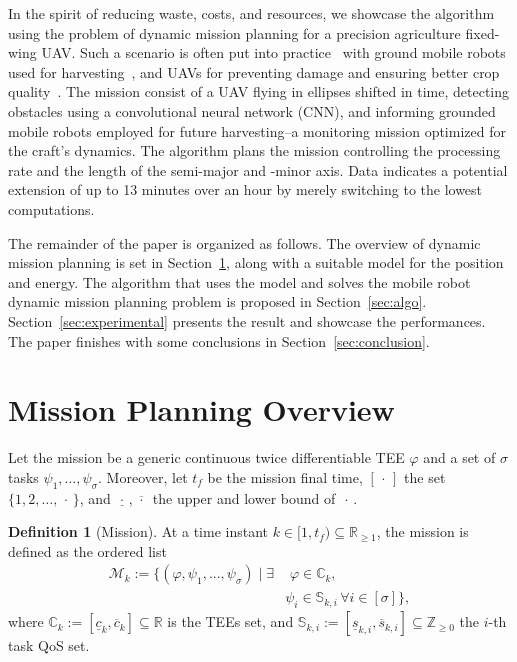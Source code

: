 \documentclass[letterpaper,10pt,conference]{ieeeconf}
\theoremstyle{definition}
\newtheorem{defn}{Definition}[section]
\begin{document}
In the spirit of reducing waste, costs, and resources, we showcase the algorithm using the problem of dynamic mission planning for a precision agriculture fixed-wing UAV. Such a scenario is often put into practice~\cite{hajjaj2014review} with ground mobile robots used for harvesting~\cite{qingchun2012study,dong2011development, de2011design, aljanobi2010setup, li2008analysis, edan2000robotic}, and UAVs for preventing damage and ensuring better crop quality~\cite{puri2017agriculture, daponte2019review}. The mission consist of a UAV flying in ellipses shifted in time, detecting obstacles using a convolutional neural network (CNN), and informing grounded mobile robots employed for future harvesting--a monitoring mission optimized for the craft's dynamics. The algorithm plans the mission controlling the processing rate and the length of the semi-major and -minor axis. Data indicates a potential extension of up to 13 minutes over an hour by merely switching to the lowest computations.

The remainder of the paper is organized as follows. The overview of dynamic mission planning is set in Section~\ref{sec:prob}, along with a suitable model for the position and energy. The algorithm that uses the model and solves the mobile robot dynamic mission planning problem is proposed in Section~\ref{sec:algo}. Section~\ref{sec:experimental} presents the result and showcase the performances. The paper finishes with some conclusions in Section~\ref{sec:conclusion}.


\section{Mission Planning Overview}
\label{sec:prob}

Let the mission be a generic continuous twice differentiable TEE $\varphi$ and a set of $\sigma$ tasks $\psi_1,\dots,\psi_{\sigma}$. Moreover, let $t_f$ be the mission final time, $[\,\cdot\,]$ the set $\{1,2,\dots,\,\cdot\,\}$, and $\underline{\,\cdot\,},\overline{\,\cdot\,}$ the upper and lower bound of $\,\cdot\,$.

\begin{defn}[Mission]\label{def:mission}
  At a time instant $k\in[1,t_f)\subseteq\mathbb{R}_{\geq 1}$, the mission is defined as the ordered list
  \begin{equation}\label{eq:mission}\begin{split}
    \mathcal{M}_k:=\{(\varphi,\psi_1,...,\psi_\sigma)\mid\exists&\,\,\varphi\in\mathbb{C}_k,\,\\&\psi_i\in\mathbb{S}_{k,i}\,\forall i\in[\sigma]\},
  \end{split}\end{equation}
  where $\mathbb{C}_k:=[\underline{c}_k,\overline{c}_k]\subseteq\mathbb{R}$ is the TEEs set, and $\mathbb{S}_{k,i}:=[\underline{s}_{k,i},\overline{s}_{k,i}]\subseteq\mathbb{Z}_{\geq 0}$ the $i$-th task QoS set.
\end{defn}
\end{document}

